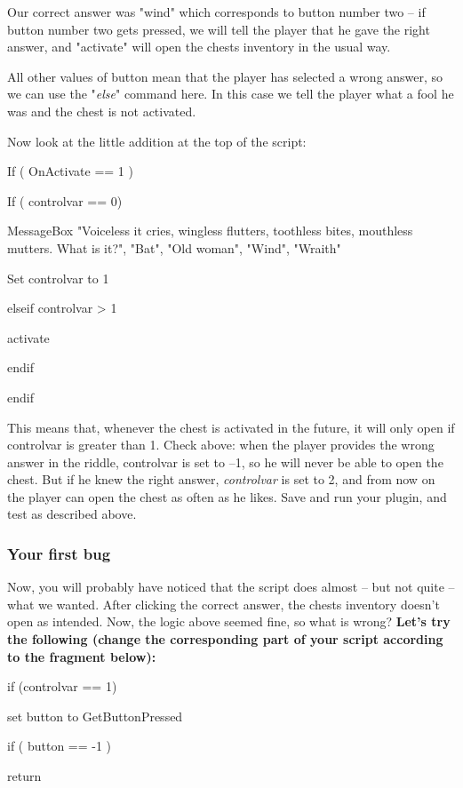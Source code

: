 \documentclass[
]{article}
\begin{document}
Our correct answer was "wind" which corresponds to button number two --
if button number two gets pressed, we will tell the player that he gave
the right answer, and "activate" will open the chests inventory in the
usual way.

All other values of button mean that the player has selected a wrong
answer, so we can use the "\emph{else}" command here. In this case we
tell the player what a fool he was and the chest is not activated.

Now look at the little addition at the top of the script:

If ( OnActivate == 1 )

If ( controlvar == 0)

MessageBox "Voiceless it cries, wingless flutters, toothless bites,
mouthless mutters. What is it?", "Bat", "Old woman", "Wind", "Wraith"

Set controlvar to 1

elseif controlvar \textgreater{} 1

activate

endif

endif

This means that, whenever the chest is activated in the future, it will
only open if controlvar is greater than 1. Check above: when the player
provides the wrong answer in the riddle, controlvar is set to --1, so he
will never be able to open the chest. But if he knew the right answer,
\emph{controlvar} is set to 2, and from now on the player can open the
chest as often as he likes. Save and run your plugin, and test as
described above.

\hypertarget{your-first-bug}{%
\subsubsection{Your first bug}\label{your-first-bug}}

Now, you will probably have noticed that the script does almost -- but
not quite -- what we wanted. After clicking the correct answer, the
chests inventory doesn't open as intended. Now, the logic above seemed
fine, so what is wrong? \textbf{Let's try the following (change the
corresponding part of your script according to the fragment below):}

if (controlvar == 1)

set button to GetButtonPressed

if ( button == -1 )

return
\end{document}
